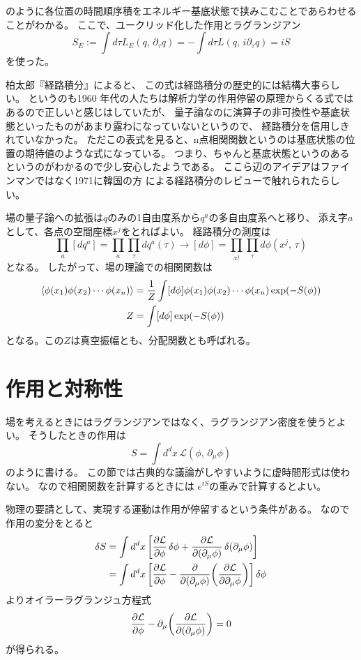 \documentclass[../../master.tex]{subfiles}
\begin{document}
のように各位置の時間順序積をエネルギー基底状態で挟みこむことであらわせることがわかる。
ここで、ユークリッド化した作用とラグランジアン
\begin{equation}
    S_E := \int d\tau L_E(q,\,\partial_\tau q) = - \int d\tau L(q,\,i\partial_\tau q) = i S
\end{equation}
を使った。

柏太郎『経路積分』\cite{book:kashiwa-taro_2015}によると、
この式は経路積分の歴史的には結構大事らしい。
というのも1960 年代の人たちは解析力学の作用停留の原理からくる式ではあるので正しいと感じはしていたが、
量子論なのに演算子の非可換性や基底状態といったものがあまり露わになっていないというので、
経路積分を信用しきれていなかった。
ただこの表式を見ると、n点相関関数というのは基底状態の位置の期待値のような式になっている。
つまり、ちゃんと基底状態というのあるというのがわかるので少し安心したようである。
ここら辺のアイデアはファインマンではなく1971に韓国の方 %
による経路積分のレビューで触れられたらしい。 %

場の量子論への拡張は\(q\)のみの1自由度系から\(q^a\)の多自由度系へと移り、
添え字\(a\)として、各点の空間座標\(x^j\)をとればよい。
経路積分の測度は
\begin{equation}
    \prod_a [dq^a] = \prod_{a}\prod_{\tau} dq^a(\tau) \rightarrow [d\phi] = \prod_{x^j}\prod_{\tau}d\phi(x^j,\,\tau)
\end{equation}
となる。
したがって、場の理論での相関関数は
\begin{align}
    \ev{\phi(x_1)\phi(x_2)\cdots\phi(x_n)}
    &= \frac{1}{Z} \int[d\phi] \phi(x_1)\phi(x_2)\cdots\phi(x_n) \exp(-S(\phi))\\
    Z
    &= \int[d\phi] \exp(-S(\phi))
\end{align}
となる。この\(Z\)は真空振幅とも、分配関数とも呼ばれる。

\section{作用と対称性}
場を考えるときにはラグランジアンではなく、ラグランジアン密度を使うとよい。
そうしたときの作用は
\begin{equation}
    S = \int d^dx\, \mathcal{L}(\phi,\,\partial_\mu \phi)
\end{equation}
のように書ける。
この節では古典的な議論がしやすいように虚時間形式は使わない。
なので相関関数を計算するときには
\(e^{iS}\)の重みで計算するとよい。

物理の要請として、実現する運動は作用が停留するという条件がある。
なので作用の変分をとると
\begin{align}
    \var{S}
    &= \int d^d x\, \qty[\pdv{\mathcal{L}}{\phi}\var{\phi}+\pdv{\mathcal{L}}{(\partial_\mu \phi)}\var(\partial_\mu \phi)] \notag\\
    &= \int d^d x\, \qty[\pdv{\mathcal{L}}{\phi}-\pdv{(\partial_\mu \phi)}\qty(\pdv{\mathcal{L}}{\partial_\mu \phi})]\var{\phi}
\end{align}
よりオイラーラグランジュ方程式
\begin{equation}
    \pdv{\mathcal{L}}{\phi}-\partial_\mu\qty(\pdv{\mathcal{L}}{(\partial_\mu \phi)}) = 0
\end{equation}
が得られる。
\end{document}
